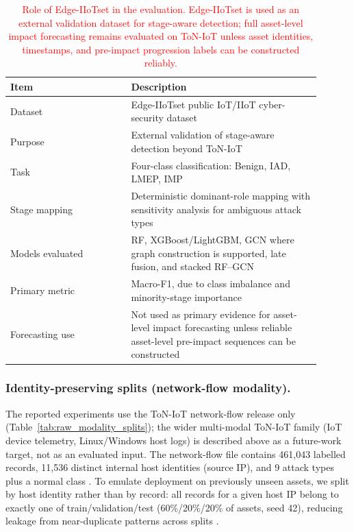 \documentclass[pdflatex,sn-mathphys-num]{sn-jnl}
\theoremstyle{thmstyleone}%
\theoremstyle{thmstyletwo}%
\theoremstyle{thmstylethree}%
\begin{document}
\begin{table}[!t]
\centering
\caption{\textcolor{red}{Role of Edge-IIoTset in the evaluation. Edge-IIoTset is used as an external validation dataset for stage-aware detection; full asset-level impact forecasting remains evaluated on ToN-IoT unless asset identities, timestamps, and pre-impact progression labels can be constructed reliably.}}
\label{tab}
\renewcommand{\arraystretch}{1.12}
\begin{tabular}{p{0.35\linewidth} p{0.55\linewidth}}
\toprule
\textbf{Item} & \textbf{Description} \\
\midrule
Dataset & Edge-IIoTset public IoT/IIoT cyber-security dataset \\
Purpose & External validation of stage-aware detection beyond ToN-IoT \\
Task & Four-class classification: Benign, IAD, LMEP, IMP \\
Stage mapping & Deterministic dominant-role mapping with sensitivity analysis for ambiguous attack types \\
Models evaluated & RF, XGBoost/LightGBM, GCN where graph construction is supported, late fusion, and stacked RF--GCN \\
Primary metric & Macro-F1, due to class imbalance and minority-stage importance \\
Forecasting use & Not used as primary evidence for asset-level impact forecasting unless reliable asset-level pre-impact sequences can be constructed \\
\bottomrule
\end{tabular}
\end{table}
\color{black}

\subsubsection{Identity-preserving splits (network-flow modality).}
The reported experiments use the ToN-IoT network-flow release only (Table~\ref{tab:raw_modality_splits}); the wider multi-modal ToN-IoT family (IoT device telemetry, Linux/Windows host logs) is described above as a future-work target, not as an evaluated input. The network-flow file contains 461{,}043 labelled records, 11{,}536 distinct internal host identities (source IP), and 9 attack types plus a normal class \cite{alsaedi2020toniot}. To emulate deployment on previously unseen assets, we split by host identity rather than by record: all records for a given host IP belong to exactly one of train/validation/test (60\%/20\%/20\% of assets, seed 42), reducing leakage from near-duplicate patterns across splits \cite{moustafa2021tonlinuxEval}.
\end{document}
